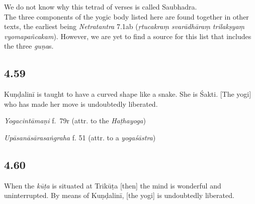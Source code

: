 \begin{ekdosis}
\begin{philcomm}[hp04_058]
We do not know why this tetrad of verses is called Saubhadra.\\

The three components of the yogic body listed here are found together in other texts, the earliest being \emph{Netratantra} 7.1ab (\emph{ṛtucakraṃ svarādhāraṃ trilakṣyaṃ vyomapañcakam}). However, we are yet to find a source for this list that includes the three \emph{guṇa}s.
\end{philcomm}

\subsection*{4.59}
\begin{translation}[hp04_059]
Kuṇḍalinī is taught to have a curved shape like a snake. She is Śakti. [The yogi] who has made her move is undoubtedly liberated.
\end{translation}


\begin{testimonia}[hp04_059]
\emph{Yogacintāmaṇi} f.~79r (attr. to the \emph{Haṭhayoga})
\begin{versinnote}
\end{versinnote}

\emph{Upāsanāsārasaṅgraha} f. 51 (attr. to a \emph{yogaśāstra})
\begin{versinnote}
\end{versinnote}
\end{testimonia}


\subsection*{4.60}
\begin{translation}[hp04_060]
When the \emph{kūṭa} is situated at Trikūṭa [then] the mind is wonderful and uninterrupted. By means of Kuṇḍalinī, [the yogi] is undoubtedly liberated.
\end{translation}


\end{ekdosis}
